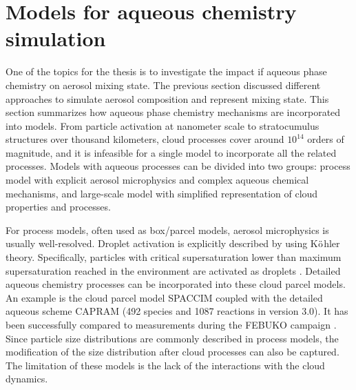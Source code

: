 \documentclass[edeposit,fullpage]{uiucthesis2009}
\begin{document}
\section{Models for aqueous chemistry simulation }
One of the topics for the thesis is to investigate the impact if
aqueous phase chemistry on aerosol mixing state. The previous section
discussed different approaches to simulate aerosol composition and
represent mixing state. This section summarizes how aqueous phase
chemistry mechanisms are incorporated into models. From particle
activation at nanometer scale to stratocumulus structures over
thousand kilometers, cloud processes cover around $10^{14}$ orders of
magnitude, and it is infeasible for a single model to incorporate all
the related processes. Models with aqueous processes can be divided
into two groups: process model with explicit aerosol microphysics and
complex aqueous chemical mechanisms, and
large-scale model with simplified representation of cloud properties
and processes.

For process models, often used as box/parcel models, aerosol
microphysics is usually well-resolved. Droplet activation is
explicitly described by using K$\rm \ddot{o}$hler
theory. Specifically, particles with critical supersaturation lower
than maximum supersaturation reached in the environment are activated
as droplets \citep{rothenberg2016metamodeling,
  ching2012impacts}. Detailed aqueous chemistry processes can be
incorporated into these cloud parcel models. An example is the cloud
parcel model SPACCIM coupled with the detailed aqueous scheme CAPRAM
(492 species and 1087 reactions in version 3.0). It has been
successfully compared to measurements during the FEBUKO campaign
\citep{wolke2005spaccim}. Since particle size distributions are
commonly described in process models, the modification of the size
distribution after cloud processes can also be captured. The
limitation of these models is the lack of the interactions with the
cloud dynamics. 
\end{document}
